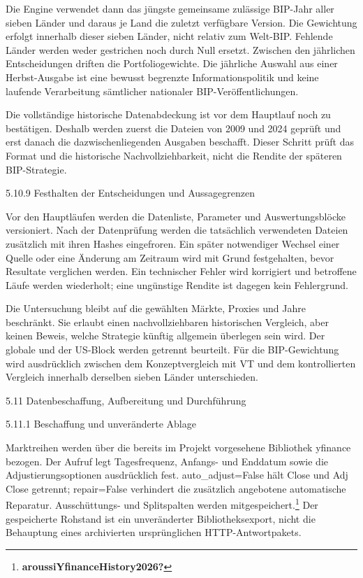\documentclass[
  ngerman,
  a4paper,
  DIV=11,
  oneside]{scrreprt}
\begin{document}
Die Engine verwendet dann das jüngste gemeinsame zulässige BIP-Jahr
aller sieben Länder und daraus je Land die zuletzt verfügbare Version.
Die Gewichtung erfolgt innerhalb dieser sieben Länder, nicht relativ zum
Welt-BIP. Fehlende Länder werden weder gestrichen noch durch Null
ersetzt. Zwischen den jährlichen Entscheidungen driften die
Portfoliogewichte. Die jährliche Auswahl aus einer Herbst-Ausgabe ist
eine bewusst begrenzte Informationspolitik und keine laufende
Verarbeitung sämtlicher nationaler BIP-Veröffentlichungen.

Die vollständige historische Datenabdeckung ist vor dem Hauptlauf noch
zu bestätigen. Deshalb werden zuerst die Dateien von 2009 und 2024
geprüft und erst danach die dazwischenliegenden Ausgaben beschafft.
Dieser Schritt prüft das Format und die historische Nachvollziehbarkeit,
nicht die Rendite der späteren BIP-Strategie.

5.10.9 Festhalten der Entscheidungen und Aussagegrenzen

Vor den Hauptläufen werden die Datenliste, Parameter und
Auswertungsblöcke versioniert. Nach der Datenprüfung werden die
tatsächlich verwendeten Dateien zusätzlich mit ihren Hashes eingefroren.
Ein später notwendiger Wechsel einer Quelle oder eine Änderung am
Zeitraum wird mit Grund festgehalten, bevor Resultate verglichen werden.
Ein technischer Fehler wird korrigiert und betroffene Läufe werden
wiederholt; eine ungünstige Rendite ist dagegen kein Fehlergrund.

Die Untersuchung bleibt auf die gewählten Märkte, Proxies und Jahre
beschränkt. Sie erlaubt einen nachvollziehbaren historischen Vergleich,
aber keinen Beweis, welche Strategie künftig allgemein überlegen sein
wird. Der globale und der US-Block werden getrennt beurteilt. Für die
BIP-Gewichtung wird ausdrücklich zwischen dem Konzeptvergleich mit VT
und dem kontrollierten Vergleich innerhalb derselben sieben Länder
unterschieden.

5.11 Datenbeschaffung, Aufbereitung und Durchführung

5.11.1 Beschaffung und unveränderte Ablage

Marktreihen werden über die bereits im Projekt vorgesehene Bibliothek
yfinance bezogen. Der Aufruf legt Tagesfrequenz, Anfangs- und Enddatum
sowie die Adjustierungsoptionen ausdrücklich fest. auto\_adjust=False
hält Close und Adj Close getrennt; repair=False verhindert die
zusätzlich angebotene automatische Reparatur. Ausschüttungs- und
Splitspalten werden mitgespeichert.\footnote{\textbf{aroussiYfinanceHistory2026?}}
Der gespeicherte Rohstand ist ein unveränderter Bibliotheksexport, nicht
die Behauptung eines archivierten ursprünglichen HTTP-Antwortpakets.
\end{document}
